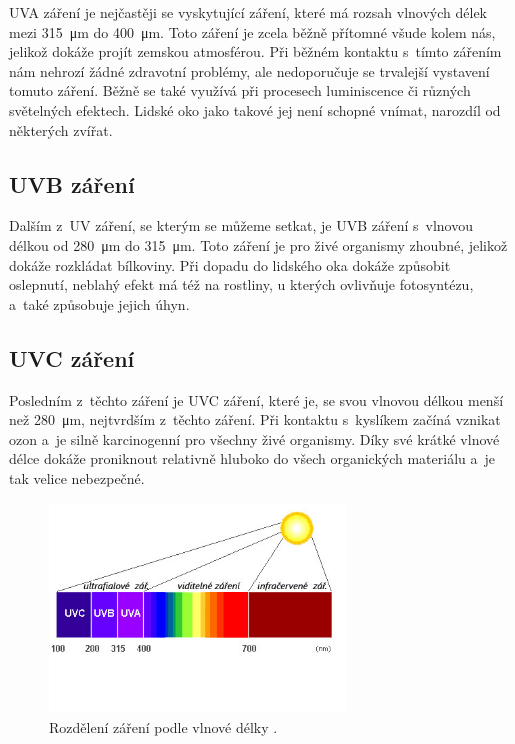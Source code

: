 UVA záření je nejčastěji se vyskytující záření, které má rozsah vlnových délek mezi \SI{315}{\micro\metre} do \SI{400}{\micro\metre}. Toto záření je zcela běžně přítomné všude kolem nás, jelikož dokáže projít zemskou atmosférou. Při běžném kontaktu s~tímto zářením nám nehrozí žádné zdravotní problémy, ale nedoporučuje se trvalejší vystavení tomuto záření. Běžně se také využívá při procesech luminiscence či různých světelných efektech. Lidské oko jako takové jej není schopné vnímat, narozdíl od některých zvířat.

\subsection{UVB záření}

Dalším z~UV záření, se kterým se můžeme setkat, je UVB záření s~vlnovou délkou od \SI{280}{\micro\metre} do \SI{315}{\micro\metre}. Toto záření je pro živé organismy zhoubné, jelikož dokáže rozkládat bílkoviny. Při dopadu do lidského oka dokáže způsobit oslepnutí, neblahý efekt má též na rostliny, u kterých ovlivňuje fotosyntézu, a~také způsobuje jejich úhyn.

\subsection{UVC záření}

Posledním z~těchto záření je UVC záření, které je, se svou vlnovou délkou menší než \SI{280}{\micro\metre}, nejtvrdším z~těchto záření. Při kontaktu s~kyslíkem začíná vznikat ozon a~je silně karcinogenní pro všechny živé organismy. Díky své krátké vlnové délce dokáže proniknout relativně hluboko do všech organických materiálu a~je tak velice nebezpečné.

\begin{figure}
    \centering
    \includegraphics[width=0.7\textwidth]{obrazky/uv_light.jpg}
    \caption[Rozdělení záření podle vlnové délky.]{Rozdělení záření podle vlnové délky \cite{picture_UVLight}.}
    \label{fig_UVLight}
\end{figure}

